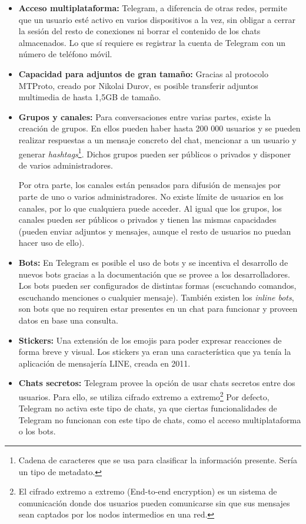 \documentclass[spanish,12pt, a4paper, twoside]{paper}
\begin{document}
\begin{itemize}
\item \textbf{Acceso multiplataforma:} Telegram, a diferencia de otras redes, permite que un usuario esté activo en varios dispositivos a la vez, sin obligar a cerrar la sesión del resto de conexiones ni borrar el contenido de los chats almacenados. Lo que sí requiere es registrar la cuenta de Telegram con un número de teléfono móvil.

\item \textbf{Capacidad para adjuntos de gran tamaño:} Gracias al protocolo MTProto, creado por Nikolai Durov, es posible transferir adjuntos multimedia de hasta 1,5GB de tamaño.

\item \textbf{Grupos y canales:} Para conversaciones entre varias partes, existe la creación de grupos. En ellos pueden haber hasta 200 000 usuarios y se pueden realizar respuestas a un mensaje concreto del chat, mencionar a un usuario y generar \emph{hashtags}\footnote{Cadena de caracteres que se usa para clasificar la información presente. Sería un tipo de metadato.}. Dichos grupos pueden ser públicos o privados y disponer de varios administradores.

Por otra parte, los canales están pensados para difusión de mensajes por parte de uno o varios administradores. No existe límite de usuarios en los canales, por lo que cualquiera puede acceder. Al igual que los grupos, los canales pueden ser públicos o privados y tienen las mismas capacidades (pueden enviar adjuntos y mensajes, aunque el resto de usuarios no puedan hacer uso de ello).

\item \textbf{Bots:} En Telegram es posible el uso de bots y se incentiva el desarrollo de nuevos bots gracias a la documentación que se provee a los desarrolladores. Los bots pueden ser configurados de distintas formas (escuchando comandos, escuchando menciones o cualquier mensaje). También existen los \emph{inline bots}, son bots que no requiren estar presentes en un chat para funcionar y proveen datos en base una consulta.

\item \textbf{Stickers:} Una extensión de los emojis para poder expresar reacciones de forma breve y visual. Los stickers ya eran una característica que ya tenía la aplicación de mensajería LINE, creada en 2011.

\item \textbf{Chats secretos:} Telegram provee la opción de usar chats secretos entre dos usuarios. Para ello, se utiliza cifrado extremo a extremo\footnote{El cifrado extremo a extremo (End-to-end encryption) es un sistema de comunicación donde dos usuarios pueden comunicarse sin que sus mensajes sean captados por los nodos intermedios en una red.} Por defecto, Telegram no activa este tipo de chats, ya que ciertas funcionalidades de Telegram no funcionan con este tipo de chats, como el acceso multiplataforma o los bots.


\end{itemize}
\end{document}
